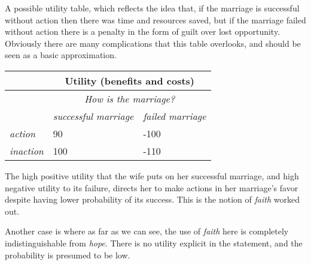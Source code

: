 A possible utility table, which reflects the idea that, if the marriage is successful without action then there was time and resources saved, but if the marriage failed without action there is a penalty in the form of guilt over lost opportunity.  Obviously there are many complications that this table overlooks, and should be seen as a basic approximation.

\vspace{.1in}
\begin{tabular}{@{}lll@{}}
\toprule
 & \multicolumn{2}{c}{\textbf{Utility (benefits and costs)}}  \\ \midrule
 & \multicolumn{2}{c}{{\em How is the marriage?}}  \\ 
  & \textit{successful marriage} & \textit{failed marriage}\\
\textit{action}  & 90 & -100   \\
\textit{inaction} &100 & -110  \\ \bottomrule
\end{tabular}
\vspace{.1in}

 The high positive utility that the wife puts on her successful marriage, and high negative utility to its failure, directs her to make actions in her marriage's favor despite having lower probability of its success.  This is the notion of {\em faith} worked out.

Another case is
where as far as we can see, the use of {\em faith} here is completely indistinguishable from {\em hope}.  There is no utility explicit in the statement, and the probability is presumed to be low.  


